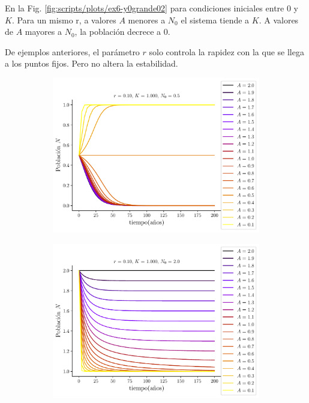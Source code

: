 \documentclass[twocolumn,aps,prl]{revtex4-1}
\begin{document}
En la Fig. \ref{fig:scripts/plots/ex6-y0grande02} para condiciones iniciales entre 0 y $K$. Para un mismo r, a valores $A$ menores a $N_0$ el sistema tiende a $K$. A valores de $A$ mayores a $N_0$, la población decrece a 0. 

De ejemplos anteriores, el parámetro $r$ solo controla la rapidez con la que se llega a los puntos fijos. Pero no altera la estabilidad.

\begin{figure}[ht!]
    \centering
    \begin{subfigure}[b]{0.495\linewidth}
        \centering
        \includegraphics[width = 0.999\textwidth]{scripts/plots/ex6-y0chico02.pdf}
        \caption{}
        \label{fig:scripts/plots/ex6-y0chico02}
    \end{subfigure}
    \begin{subfigure}[b]{0.495\linewidth}
        \centering
        \includegraphics[width = 0.999\textwidth]{scripts/plots/ex6-y0grande02.pdf}

\end{subfigure}
\end{figure}
\end{document}
